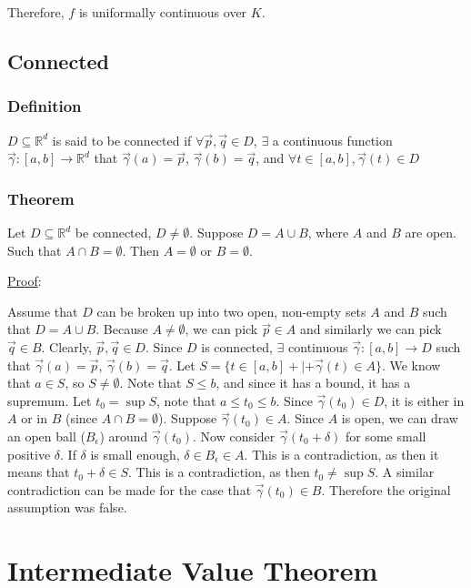 \documentclass[11 pt, twoside]{article}
\begin{document}
Therefore, $f$ is uniformally continuous over $K$.

\subsection{Connected}

\subsubsection{Definition}
$D \subseteq \mathbb{R}^d$ is said to be connected if $\forall \vec{p},
\vec{q} \in D$, $\exists$ a continuous function $\vec{\gamma}:[a, b] \to
\mathbb{R}^d$ that $\vec{\gamma}(a) = \vec{p}$, $\vec{\gamma}(b) = \vec{q}$,
and $\forall t \in [a, b], \vec{\gamma}(t) \in D$

\subsubsection{Theorem}

Let $D \subseteq \mathbb{R}^d$ be connected, $D \neq \emptyset$. Suppose $D =
A \cup B$, where $A$ and $B$ are open. Such that $A \cap B = \emptyset$. Then $A
= \emptyset$ or $B = \emptyset$.

\underline{Proof}:

Assume that $D$ can be broken up into two open, non-empty sets $A$ and $B$ such
that $D = A \cup B$. Because $A \neq \emptyset$, we can pick $\vec{p} \in A$ and
similarly we can pick $\vec{q} \in B$. Clearly, $\vec{p}, \vec{q} \in D$. Since
$D$ is connected, $\exists$ continuous $\vec{\gamma}: [a, b] \to D$ such that
$\vec{\gamma}(a) = \vec{p}$, $\vec{\gamma}(b) = \vec{q}$. Let $S = \{t \in [a,b]
+|+ \vec{\gamma}(t) \in A\}$. We know that $a \in S$, so $S \neq \emptyset$.
Note that $S \leq b$, and since it has a bound, it has a supremum. Let $t_0 =
\sup S$, note that $a \leq t_0 \leq b$. Since $\vec{\gamma}(t_0) \in D$, it is
either in $A$ or in $B$ (since $A \cap B = \emptyset$). Suppose
$\vec{\gamma}(t_0) \in A$. Since $A$ is open, we can draw an open ball
($B_\epsilon$) around $\vec{\gamma}(t_0)$. Now consider $\vec{\gamma}(t_0 +
\delta)$ for some small positive $\delta$. If $\delta$ is small enough, $\delta
\in B_\epsilon \in A$. This is a contradiction, as then it means that $t_0 +
\delta \in S$. This is a contradiction, as then $t_0 \neq \sup S$. A similar
contradiction can be made for the case that $\vec{\gamma}(t_0) \in B$. Therefore
the original assumption was false.

\section{Intermediate Value Theorem}
\end{document}
